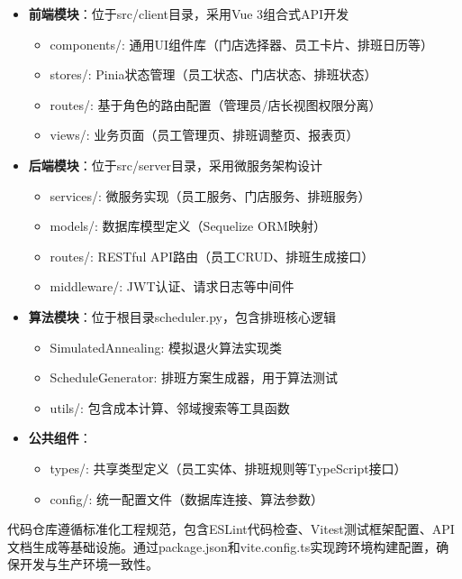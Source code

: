 \documentclass{ctexart}
\begin{document}
\begin{itemize}
    \item \textbf{前端模块}：位于src/client目录，采用Vue 3组合式API开发
    \begin{itemize}
        \item components/: 通用UI组件库（门店选择器、员工卡片、排班日历等）
        \item stores/: Pinia状态管理（员工状态、门店状态、排班状态）
        \item routes/: 基于角色的路由配置（管理员/店长视图权限分离）
        \item views/: 业务页面（员工管理页、排班调整页、报表页）
    \end{itemize}

    \item \textbf{后端模块}：位于src/server目录，采用微服务架构设计
    \begin{itemize}
        \item services/: 微服务实现（员工服务、门店服务、排班服务）
        \item models/: 数据库模型定义（Sequelize ORM映射）
        \item routes/: RESTful API路由（员工CRUD、排班生成接口）
        \item middleware/: JWT认证、请求日志等中间件
    \end{itemize}

    \item \textbf{算法模块}：位于根目录scheduler.py，包含排班核心逻辑
    \begin{itemize}
        \item SimulatedAnnealing: 模拟退火算法实现类
        \item ScheduleGenerator: 排班方案生成器，用于算法测试
        \item utils/: 包含成本计算、邻域搜索等工具函数
    \end{itemize}

    \item \textbf{公共组件}：
    \begin{itemize}
        \item types/: 共享类型定义（员工实体、排班规则等TypeScript接口）
        \item config/: 统一配置文件（数据库连接、算法参数）
    \end{itemize}
\end{itemize}
代码仓库遵循标准化工程规范，包含ESLint代码检查、Vitest测试框架配置、API文档生成等基础设施。通过package.json和vite.config.ts实现跨环境构建配置，确保开发与生产环境一致性。
\end{document}
